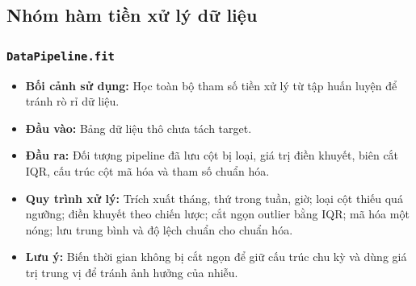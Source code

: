 \documentclass[a4paper]{article}
\newcommand{\code}[1]{\colorbox{light-gray}{\texttt{#1}}}
\begin{document}
\subsection{Nhóm hàm tiền xử lý dữ liệu}

\subsubsection{\code{DataPipeline.fit}}
\begin{itemize}[leftmargin=*]
    \item \textbf{Bối cảnh sử dụng:} Học toàn bộ tham số tiền xử lý từ tập huấn luyện để tránh rò rỉ dữ liệu.
    \item \textbf{Đầu vào:} Bảng dữ liệu thô chưa tách target.
    \item \textbf{Đầu ra:} Đối tượng pipeline đã lưu cột bị loại, giá trị điền khuyết, biên cắt IQR, cấu trúc cột mã hóa và tham số chuẩn hóa.
    \item \textbf{Quy trình xử lý:} Trích xuất tháng, thứ trong tuần, giờ; loại cột thiếu quá ngưỡng; điền khuyết theo chiến lược; cắt ngọn outlier bằng IQR; mã hóa một nóng; lưu trung bình và độ lệch chuẩn cho chuẩn hóa.
    \item \textbf{Lưu ý:} Biến thời gian không bị cắt ngọn để giữ cấu trúc chu kỳ và dùng giá trị trung vị để tránh ảnh hưởng của nhiễu.
\end{itemize}
\end{document}
